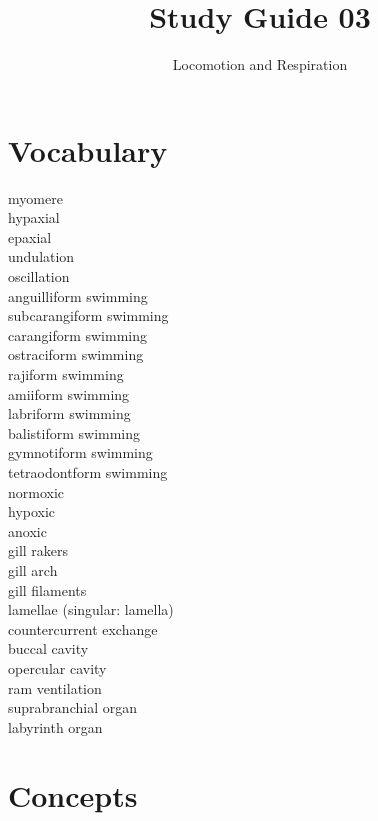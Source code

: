 \documentclass[nofonts, letterpaper]{tufte-handout}
\title{Study Guide 03}
\author{Locomotion and Respiration}
\date{} %
\begin{document}
\maketitle	%


\section{Vocabulary} 
\vspace{-1\baselineskip}
\begin{multicols}{2}
myomere\\
hypaxial\\
epaxial\\
undulation \\
oscillation \\
anguilliform swimming \\
subcarangiform swimming \\
carangiform swimming \\
ostraciform swimming \\
rajiform swimming \\
amiiform swimming  \\
labriform swimming \\
balistiform swimming \\
gymnotiform swimming \\
tetraodontform swimming \\
normoxic \\
hypoxic \\
anoxic \\
gill rakers \\
gill arch \\
gill filaments \\
lamellae (singular: lamella) \\
countercurrent exchange \\
buccal cavity \\
opercular cavity \\
ram ventilation \\
suprabranchial organ \\
labyrinth organ
\end{multicols}

\section{Concepts}
\end{document}
